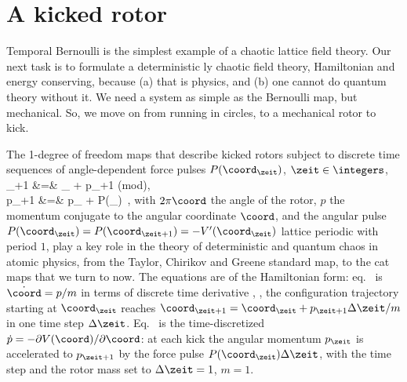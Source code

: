 
\section{A kicked rotor}
\label{s:kickRot}

Temporal Bernoulli is the simplest example of a chaotic lattice field
theory. Our next task is to formulate a deterministic {\spt}ly chaotic
field theory, Hamiltonian and energy conserving, because (a) that is
physics, and (b) one cannot do quantum theory without it. We need a
system as simple as the Bernoulli map, but mechanical. So, we move on
from running in circles, to a mechanical rotor to kick.

The 1-degree of freedom maps that describe kicked rotors
subject to discrete time sequences of angle-dependent force pulses
$P(\coord_{\zeit})$, $\zeit\in\integers$,
\bea
\coord_{\zeit+1} &=& \coord_{\zeit} + p_{\zeit+1} \qquad  (\mbox{mod}),
    \label{LC21PerViv2.1b}\\
p_{\zeit+1}       &=& p_{\zeit} + P(\coord_{\zeit})
\,,
    \label{LC21PerViv2.1a}
\eea
with $2\pi \coord$ the  angle of the rotor, $p$ the momentum conjugate to
the angular coordinate $\coord$, and the angular pulse
$P(\coord_{\zeit})=P(\coord_{\zeit+1})=-V'(\coord_{\zeit})$ lattice
periodic with period $1$, play a key role in the theory of deterministic
and quantum chaos in  atomic physics, from the Taylor, Chirikov and
Greene  standard map, to the cat maps that
we turn to now. The equations are of the Hamiltonian form:
eq.~ is $\dot{\coord}=p/m$ in terms of discrete
time derivative , \ie, the configuration trajectory
starting at $\coord_{\zeit}$ reaches
$\coord_{\zeit+1}=\coord_{\zeit}+p_{\zeit+1}\Delta{\zeit}/m$ in one time
step $\Delta{\zeit}$. Eq.~ is the time-discretized
$\dot{p}=-\partial V(\coord)/\partial \coord$: at each kick the angular
momentum $p_{\zeit}$ is accelerated to $p_{\zeit+1}$ by the force pulse
$P(\coord_{\zeit})\Delta{\zeit}$, with the time step and the rotor mass
set to $\Delta{\zeit}=1$,  $m=1$.

